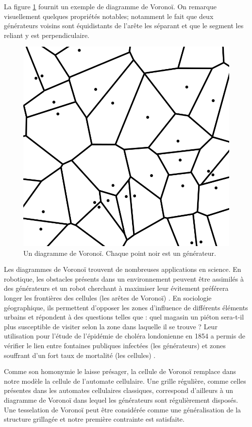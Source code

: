 \documentclass[10pt]{article}
\begin{document}
La figure \ref{fig:voronoi} fournit un exemple de diagramme de
Voronoï. On remarque visuellement quelques propriétés notables;
notamment le fait que deux générateurs voisins sont équidistants de
l'arête les séparant et que le segment les reliant y est
perpendiculaire.

\begin{figure}[!ht]
  \centering
  \includegraphics[width=0.7\linewidth]{images/voronoi.png}
  \caption{Un diagramme de Voronoï. Chaque point noir est un générateur.}
  \label{fig:voronoi}
\end{figure}

Les diagrammes de Voronoï trouvent de nombreuses applications en
science. En robotique, les obstacles présents dans un environnement
peuvent être assimilés à des générateurs et un robot cherchant à
maximiser leur évitement préférera longer les frontières des cellules
(les arêtes de Voronoï) \cite{Garrido2006}. En sociologie
géographique, ils permettent d'opposer les zones d'influence de
différents éléments urbains et répondent à des questions telles que :
quel magasin un piéton sera-t-il plus susceptible de visiter selon la
zone dans laquelle il se trouve ? Leur utilisation pour l'étude de
l'épidémie de choléra londonienne en 1854 a permis de vérifier le lien
entre fontaines publiques infectées (les générateurs) et zones
souffrant d'un fort taux de mortalité (les cellules)
\cite{Thomas2010}.

Comme son homonymie le laisse présager, la cellule de Voronoï remplace
dans notre modèle la cellule de l'automate cellulaire. Une grille
régulière, comme celles présentes dans les automates cellulaires
classiques, correspond d'ailleurs à un diagramme de Voronoï dans
lequel les générateurs sont régulièrement disposés. Une tesselation de
Voronoï peut être considérée comme une généralisation de la structure
grillagée et notre première contrainte est satisfaite.
\end{document}
